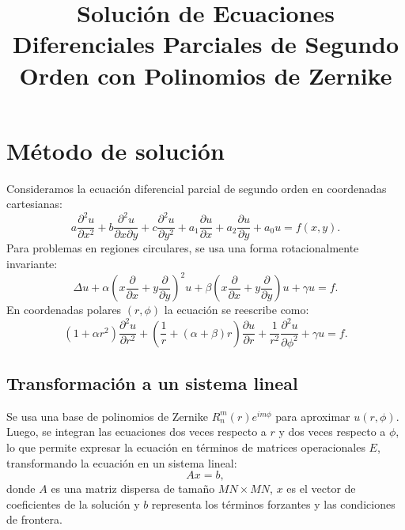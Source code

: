 \documentclass{article}
\begin{document}
\title{Solución de Ecuaciones Diferenciales Parciales de Segundo Orden con Polinomios de Zernike}
\author{}
\date{}
\maketitle

\section{Método de solución}

Consideramos la ecuación diferencial parcial de segundo orden en coordenadas cartesianas:
\begin{equation}
    a \frac{\partial^2 u}{\partial x^2} + b \frac{\partial^2 u}{\partial x \partial y} + c \frac{\partial^2 u}{\partial y^2} + a_1 \frac{\partial u}{\partial x} + a_2 \frac{\partial u}{\partial y} + a_0 u = f(x, y).
\end{equation}
Para problemas en regiones circulares, se usa una forma rotacionalmente invariante:
\begin{equation}
    \Delta u + \alpha \left( x \frac{\partial}{\partial x} + y \frac{\partial}{\partial y} \right)^2 u + \beta \left( x \frac{\partial}{\partial x} + y \frac{\partial}{\partial y} \right) u + \gamma u = f.
\end{equation}
En coordenadas polares $ (r, \phi) $ la ecuación se reescribe como:
\begin{equation}
    (1 + \alpha r^2) \frac{\partial^2 u}{\partial r^2} + \left( \frac{1}{r} + (\alpha + \beta) r \right) \frac{\partial u}{\partial r} + \frac{1}{r^2} \frac{\partial^2 u}{\partial \phi^2} + \gamma u = f.
\end{equation}

\subsection{Transformación a un sistema lineal}

Se usa una base de polinomios de Zernike $ R_n^m(r) e^{im\phi} $ para aproximar $ u(r,\phi) $. Luego, se integran las ecuaciones dos veces respecto a $ r $ y dos veces respecto a $ \phi $, lo que permite expresar la ecuación en términos de matrices operacionales $ E $, transformando la ecuación en un sistema lineal:
\begin{equation}
    A x = b,
\end{equation}
donde $ A $ es una matriz dispersa de tamaño $ MN \times MN $, $ x $ es el vector de coeficientes de la solución y $ b $ representa los términos forzantes y las condiciones de frontera.
\end{document}
